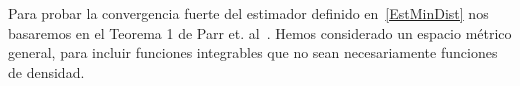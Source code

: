 %
%
%
%
Para probar la convergencia fuerte del estimador definido en~\ref{EstMinDist} nos basaremos en el Teorema 1 de Parr et. al~\cite{parr1982}. Hemos considerado un espacio métrico general, para incluir funciones integrables que no sean necesariamente funciones de densidad. 

